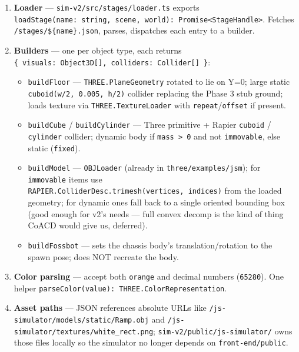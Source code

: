 \documentclass[
]{article}
\providecommand{\tightlist}{%
  \setlength{\itemsep}{0pt}\setlength{\parskip}{0pt}}
\begin{document}
\begin{enumerate}
\def\labelenumi{\arabic{enumi}.}
\tightlist
\item
  \textbf{Loader} --- \texttt{sim-v2/src/stages/loader.ts} exports
  \texttt{loadStage(name:\ string,\ scene,\ world):\ Promise\textless{}StageHandle\textgreater{}}.
  Fetches \texttt{/stages/\$\{name\}.json}, parses, dispatches each
  entry to a builder.
\item
  \textbf{Builders} --- one per object type, each returns
  \texttt{\{\ visuals:\ Object3D{[}{]},\ colliders:\ Collider{[}{]}\ \}}:

  \begin{itemize}
  \tightlist
  \item
    \texttt{buildFloor} --- \texttt{THREE.PlaneGeometry} rotated to lie
    on Y=0; large static \texttt{cuboid(w/2,\ 0.005,\ h/2)} collider
    replacing the Phase 3 stub ground; loads texture via
    \texttt{THREE.TextureLoader} with \texttt{repeat}/\texttt{offset} if
    present.
  \item
    \texttt{buildCube} / \texttt{buildCylinder} --- Three primitive +
    Rapier \texttt{cuboid} / \texttt{cylinder} collider; dynamic body if
    \texttt{mass\ \textgreater{}\ 0} and not \texttt{immovable}, else
    static (\texttt{fixed}).
  \item
    \texttt{buildModel} --- \texttt{OBJLoader} (already in
    \texttt{three/examples/jsm}); for \texttt{immovable} items use
    \texttt{RAPIER.ColliderDesc.trimesh(vertices,\ indices)} from the
    loaded geometry; for dynamic ones fall back to a single oriented
    bounding box (good enough for v2's needs --- full convex decomp is
    the kind of thing CoACD would give us, deferred).
  \item
    \texttt{buildFossbot} --- sets the chassis body's
    translation/rotation to the spawn pose; does NOT recreate the body.
  \end{itemize}
\item
  \textbf{Color parsing} --- accept both
  \texttt{\textquotesingle{}orange\textquotesingle{}} and decimal
  numbers (\texttt{65280}). One helper
  \texttt{parseColor(value):\ THREE.ColorRepresentation}.
\item
  \textbf{Asset paths} --- JSON references absolute URLs like
  \texttt{/js-simulator/models/static/Ramp.obj} and
  \texttt{/js-simulator/textures/white\_rect.png};
  \texttt{sim-v2/public/js-simulator/} owns those files locally so the
  simulator no longer depends on \texttt{front-end/public}.


\end{enumerate}
\end{document}
